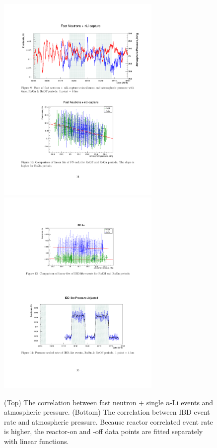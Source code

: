 \begin{figure}[h!]
    \centering
    \includegraphics[width=0.7\textwidth]{Figures/FNAtmosphere.pdf}\\
    \includegraphics[width=0.7\textwidth]{Figures/IBDAtmosphere.pdf}
    \caption[Correlations between atmospheric pressure and neutron/IBD event rate.]{
    (Top) The correlation between fast neutron + single $n$-Li events and atmospheric pressure.
    (Bottom) The correlation between IBD event rate and atmospheric pressure.
    Because reactor correlated event rate is higher, the reactor-on and -off data points are fitted separately with linear functions.}
    \label{fig:atmosphere}
\end{figure}

